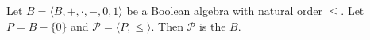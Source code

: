 Let $B = \langle B, +, \cdot, -, 0, 1 \rangle$ be a Boolean algebra with natural order $\leq$. Let $P = B - \{0\}$ and $\mathcal{P} = \langle P, \leq \rangle$. Then $\mathcal{P}$ is the  $B$.
